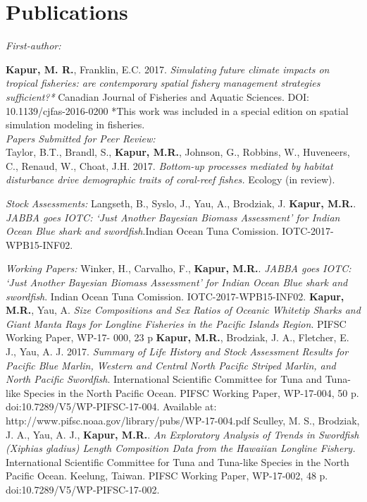 \documentclass[10pt, letterpaper]{article}
\begin{document}
\section*{Publications}
\noindent \textit{First-author:}

\hangindent=0.5cm \noindent \textbf{Kapur, M. R.}, Franklin, E.C. 2017. \textit{Simulating future climate impacts on tropical fisheries: are contemporary spatial fishery management strategies sufficient?*} Canadian Journal of Fisheries and Aquatic Sciences.  DOI: 10.1139/cjfas-2016-0200 
*This work was included in a special edition on spatial simulation modeling in fisheries. \\

\noindent \textit{Papers Submitted for Peer Review:}\\
\hangindent=0.5cm \noindent Taylor, B.T., Brandl, S., \textbf{Kapur, M.R.},  Johnson, G., Robbins, W., Huveneers, C., Renaud, W., Choat, J.H. 2017.
\textit{Bottom-up processes mediated by habitat disturbance drive demographic traits of coral-reef fishes.} Ecology (in review).\newline

\noindent \textit{Stock Assessments:}\newline
\hangindent=0.5cm \noindent Langseth, B., Syslo, J., Yau, A., Brodziak, J. \textbf{Kapur, M.R.}. \textit{JABBA goes IOTC: ‘Just Another Bayesian Biomass Assessment’ for Indian Ocean Blue shark and swordfish}.Indian Ocean Tuna Comission. IOTC-2017-WPB15-INF02.  \newline


\noindent \textit{Working Papers:}\newline
\hangindent=0.5cm \noindent Winker, H., Carvalho, F., \textbf{Kapur, M.R.}. \textit{JABBA goes IOTC: ‘Just Another Bayesian Biomass Assessment’ for Indian Ocean Blue shark and swordfish}. Indian Ocean Tuna Comission. IOTC-2017-WPB15-INF02.  \newline
\hangindent=0.5cm \noindent  \textbf{Kapur, M.R.}, Yau, A. \textit{Size Compositions and Sex Ratios of Oceanic Whitetip Sharks and Giant Manta Rays for Longline Fisheries in the Pacific Islands Region}.  PIFSC Working Paper, WP-17- 000, 23 p  \newline
\hangindent=0.5cm \noindent  \textbf{Kapur, M.R.},  Brodziak, J. A., Fletcher, E. J., Yau, A. J. 2017. \textit{Summary of Life History and Stock Assessment Results for Pacific Blue Marlin, Western and Central North Pacific Striped Marlin, and North Pacific Swordfish}. International Scientific Committee for Tuna and Tuna-like Species in the North Pacific Ocean. PIFSC Working Paper, WP-17-004, 50 p. doi:10.7289/V5/WP-PIFSC-17-004. Available at: http://www.pifsc.noaa.gov/library/pubs/WP-17-004.pdf \newline
\hangindent=0.5cm \noindent  Sculley, M. S., Brodziak, J. A., Yau, A. J., \textbf{Kapur, M.R.}.  \textit{An Exploratory Analysis of Trends in Swordfish (Xiphias gladius) Length Composition Data from the Hawaiian Longline Fishery.} International Scientific Committee for Tuna and Tuna-like Species in the North Pacific Ocean. Keelung, Taiwan. PIFSC Working Paper, WP-17-002, 48 p. doi:10.7289/V5/WP-PIFSC-17-002. \\
\end{document}
